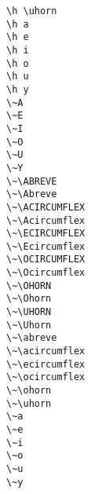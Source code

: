 \begin{multicols}{2}
\X{\h \uhorn} \verb|\h \uhorn| \\
 \verb|\h a| \\
 \verb|\h e| \\
 \verb|\h i| \\
 \verb|\h o| \\
 \verb|\h u| \\
 \verb|\h y| \\
 \verb|\~A| \\
 \verb|\~E| \\
 \verb|\~I| \\
 \verb|\~O| \\
 \verb|\~U| \\
 \verb|\~Y| \\
\X{\~\ABREVE} \verb|\~\ABREVE| \\
\X{\~\Abreve} \verb|\~\Abreve| \\
\X{\~\ACIRCUMFLEX} \verb|\~\ACIRCUMFLEX| \\
\X{\~\Acircumflex} \verb|\~\Acircumflex| \\
\X{\~\ECIRCUMFLEX} \verb|\~\ECIRCUMFLEX| \\
\X{\~\Ecircumflex} \verb|\~\Ecircumflex| \\
\X{\~\OCIRCUMFLEX} \verb|\~\OCIRCUMFLEX| \\
\X{\~\Ocircumflex} \verb|\~\Ocircumflex| \\
\X{\~\OHORN} \verb|\~\OHORN| \\
\X{\~\Ohorn} \verb|\~\Ohorn| \\
\X{\~\UHORN} \verb|\~\UHORN| \\
\X{\~\Uhorn} \verb|\~\Uhorn| \\
\X{\~\abreve} \verb|\~\abreve| \\
\X{\~\acircumflex} \verb|\~\acircumflex| \\
\X{\~\ecircumflex} \verb|\~\ecircumflex| \\
\X{\~\ocircumflex} \verb|\~\ocircumflex| \\
\X{\~\ohorn} \verb|\~\ohorn| \\
\X{\~\uhorn} \verb|\~\uhorn| \\
 \verb|\~a| \\
 \verb|\~e| \\
 \verb|\~i| \\
 \verb|\~o| \\
 \verb|\~u| \\
 \verb|\~y| \\
\end{multicols}
